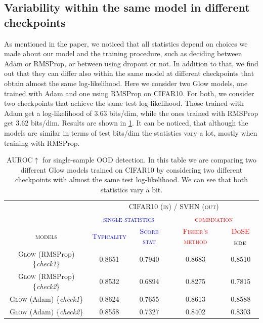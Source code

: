 {\subsection{Variability within the same model in different checkpoints}
\label{appendix_modelagnostic:checkpoints}
As mentioned in the paper, we noticed that all statistics depend on choices we made about our model and the training procedure, such as deciding between Adam or RMSProp, or between using dropout or not. In addition to that, we find out that they can differ also within the same model at different checkpoints that obtain almost the same log-likelihood. Here we consider two Glow models, one trained with Adam and one using RMSProp on CIFAR10. For both, we consider two checkpoints that achieve the same test log-likelihood. Those trained with Adam get a log-likelihood of $3.63$ bits/dim, while the ones trained with RMSProp get $3.62$ bits/dim. Results are shown in \cref{tab_modelagnostic:variability}. It can be noticed, that although the models are similar in terms of test bits/dim the statistics vary a lot, mostly when training with RMSProp.

\begin{table}[tb]
    \centering
    \caption[AUROC$\uparrow$ for single-sample OOD detection comparing two different Glow models on single and combined statistics.]{AUROC$\uparrow$ for single-sample OOD detection. In this table we are comparing two different Glow models trained on CIFAR10 by considering two different checkpoints with almost the same test log-likelihood. We can see that both statistics vary a bit.}
        \scriptsize
        \begin{tabular}{ccccc}
            \toprule
            &\multicolumn{4}{c}{\textsc{CIFAR10 (in) / SVHN (out)}}\\
            \cmidrule{2-5}
            & \multicolumn{2}{c}{\textcolor{blue}{\textsc{single statistics}}} & \multicolumn{2}{c}{\textcolor{red}{\textsc{combination}}}\\
            \cmidrule(r){2-3}\cmidrule(l){4-5}
            \textsc{models}  &  \textcolor{blue}{\textsc{Typicality}} & \textcolor{blue}{\textsc{Score stat}} & \textcolor{red}{\textsc{Fisher's method}} & \textcolor{red}{\textsc{DoSE$_{\textup{KDE}}$}} \\
            \midrule
            \textsc{Glow} (RMSProp) \{\emph{check1}\} & 0.8651 &  0.7940  &  0.8683 &  0.8510\\
            \textsc{Glow} (RMSProp) \{\emph{check2}\} & 0.8532 &  0.6894  & 0.8275 & 0.7815\\
            \midrule
            \textsc{Glow} (Adam)  \{\emph{check1}\} & 0.8624 &  0.7655 & 0.8613 & 0.8588\\
            \textsc{Glow} (Adam) \{\emph{check2}\} & 0.8558 & 0.7327 & 0.8402 & 0.8303\\
            \bottomrule
        \end{tabular}
        \label{tab_modelagnostic:variability}
\end{table}



}
